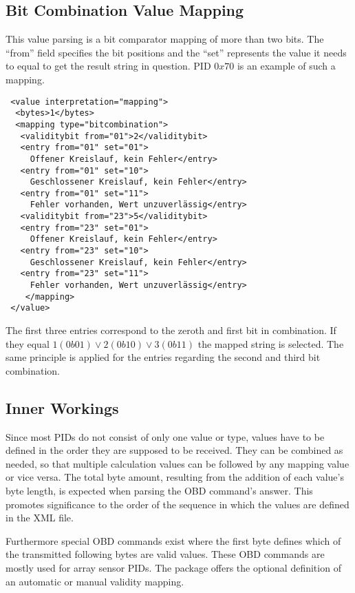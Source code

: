 \subsection{Bit Combination Value Mapping}

This value parsing is a bit comparator mapping of more than two bits. The ``from'' field specifies the bit positions and the ``set'' represents the 
value it needs to equal to get the result string in question. PID $0x70$ is an example of such a mapping.

\begin{verbatim}
 <value interpretation="mapping">
  <bytes>1</bytes>
  <mapping type="bitcombination">
   <validitybit from="01">2</validitybit>
   <entry from="01" set="01">
     Offener Kreislauf, kein Fehler</entry>
   <entry from="01" set="10">
     Geschlossener Kreislauf, kein Fehler</entry>
   <entry from="01" set="11">
     Fehler vorhanden, Wert unzuverlässig</entry>
   <validitybit from="23">5</validitybit>
   <entry from="23" set="01">
     Offener Kreislauf, kein Fehler</entry>
   <entry from="23" set="10">
     Geschlossener Kreislauf, kein Fehler</entry>
   <entry from="23" set="11">
     Fehler vorhanden, Wert unzuverlässig</entry>
    </mapping>    
 </value>
\end{verbatim}

The first three entries correspond to the zeroth and first bit in combination. If they equal $1(0b01) \vee 2(0b10) \vee 3(0b11)$ the mapped string is selected.
The same principle is applied for the entries regarding the second and third bit combination.

\subsection{Inner Workings}

Since most PIDs do not consist of only one value or type, values have to be defined in the order they are supposed to be received. They can be 
combined as needed, so that multiple calculation values can be followed by any mapping value or vice versa. The total byte amount, resulting from the
addition of each value's byte length, is expected when parsing the OBD command's answer. This promotes significance to the order of the sequence in which the 
values are defined in the XML file.

Furthermore special OBD commands exist where the first byte defines which of the transmitted following bytes are valid values. These OBD 
commands are mostly used for array sensor PIDs. The package offers the optional definition of an automatic or manual validity mapping.

